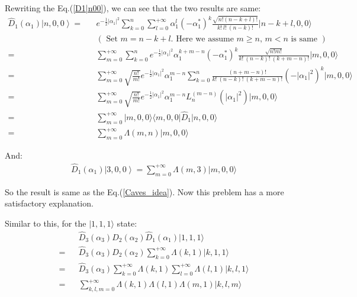 \documentclass[%
 reprint,
 amsmath,amssymb,
 aps,
onecolumn
]{revtex4-2}
\begin{document}
Rewriting the Eq.(\ref{D1|n00}), we can see that the two results are same:
\begin{eqnarray}
  \hat{D}_1(\alpha_1) \left|n,0,0\right\rangle =&&
  e^{-\frac{1}{2}|\alpha_1|^2} \sum_{k=0}^{n} \sum_{l=0}^{+\infty}
  \alpha_1^l {(-\alpha_1^*)}^k \frac{\sqrt{n!(n-k+l)!}}{k!~l!~(n-k)!}
  |n-k+l,0,0\rangle 
  \nonumber \\ &&
  ( \text{ Set $m=n-k+l$. Here we assume $m \geqslant n$, $m<n$ is same } )
  \nonumber \\ = &&
  \sum_{m=0}^{+\infty} \sum_{k=0}^{n} e^{-\frac{1}{2}|\alpha_1|^2}
  \alpha_1^{k+m-n} {(-\alpha_1^*)}^k \frac{\sqrt{n!m!}}{k!~(n-k)!~(k+m-n)!}
  |m,0,0\rangle
  \nonumber \\ = &&
  \sum_{m=0}^{+\infty} \sqrt{\frac{n!}{m!}} e^{-\frac{1}{2}|\alpha_1|^2} \alpha_1^{m-n} 
  \sum_{k=0}^{n} \frac{(n+m-n)!}{k!~(n-k)!~(k+m-n)!} {(-{|\alpha_1|}^2)}^k
  |m,0,0\rangle
  \nonumber \\ = &&
  \sum_{m=0}^{+\infty} \sqrt{\frac{n!}{m!}} e^{-\frac{1}{2}|\alpha_1|^2} \alpha_1^{m-n}  L_n^{(m-n)} (|\alpha_1|^2) 
  |m,0,0\rangle
  \nonumber \\ = &&
  \sum_{m=0}^{+\infty} |m,0,0\rangle \langle m,0,0 |\hat{D}_1| n,0,0\rangle
  \nonumber \\ = &&
  \sum_{m=0}^{+\infty} \Lambda(m,n) |m,0,0\rangle
  \label{newway_D1|n00}
\end{eqnarray}

And:
\begin{eqnarray}
  \hat{D}_1(\alpha_1) \left|3,0,0\right\rangle =
  \sum_{m=0}^{+\infty} \Lambda(m,3) |m,0,0\rangle
  \label{newway_D1|300}
\end{eqnarray}

So the result is same as the Eq.(\ref{Caves_idea}). 
Now this preblem has a more satisfactory explanation.

Similar to this, for the $|1,1,1\rangle$ state:
\begin{eqnarray}
  && \hat{D}_3(\alpha_3)\hat{D}_2(\alpha_2)\hat{D}_1(\alpha_1) |1,1,1\rangle 
  \nonumber \\ = &&
  \hat{D}_3(\alpha_3)\hat{D}_2(\alpha_2)\sum_{k=0}^{+\infty} \Lambda(k,1) |k,1,1\rangle
  \nonumber \\ = &&
  \hat{D}_3(\alpha_3)\sum_{k=0}^{+\infty} \Lambda(k,1) \sum_{l=0}^{+\infty} \Lambda(l,1) |k,l,1\rangle
  \nonumber \\ = &&
  \sum_{k,l,m=0}^{+\infty} \Lambda(k,1) \Lambda(l,1) \Lambda(m,1) |k,l,m\rangle
  \label{newway_D123|111}
\end{eqnarray}
\end{document}
